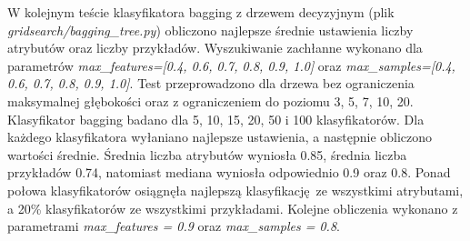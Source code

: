 \par
W kolejnym teście klasyfikatora bagging z drzewem decyzyjnym (plik \textit{gridsearch/bagging\_tree.py}) obliczono najlepsze średnie ustawienia liczby atrybutów oraz liczby przykładów. Wyszukiwanie zachłanne wykonano dla parametrów \textit{max\_features=[0.4, 0.6, 0.7, 0.8, 0.9, 1.0]} oraz \textit{max\_samples=[0.4, 0.6, 0.7, 0.8, 0.9, 1.0]}. Test przeprowadzono dla drzewa bez ograniczenia maksymalnej głębokości oraz z ograniczeniem do poziomu 3, 5, 7, 10, 20. Klasyfikator bagging badano dla 5, 10, 15, 20, 50 i 100 klasyfikatorów. Dla każdego klasyfikatora wyłaniano najlepsze ustawienia, a następnie obliczono wartości średnie. Średnia liczba atrybutów wyniosła 0.85, średnia liczba przykładów 0.74, natomiast mediana wyniosła odpowiednio 0.9 oraz 0.8. Ponad połowa klasyfikatorów osiągnęła najlepszą klasyfikację ze wszystkimi atrybutami, a 20\% klasyfikatorów ze wszystkimi przykładami. Kolejne obliczenia wykonano z parametrami \textit{max\_features = 0.9} oraz \textit{max\_samples = 0.8}. 
